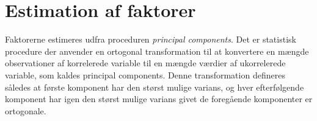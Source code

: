 \section{Estimation af faktorer}
Faktorerne estimeres udfra proceduren \textit{principal components}.
Det er statistisk procedure der anvender en ortogonal transformation til at konvertere en mængde observationer af korrelerede variable til en mængde værdier af ukorrelerede variable, som kaldes principal components.
Denne transformation defineres således at første komponent har den størst mulige varians, og hver efterfølgende komponent har igen den størst mulige varians givet de foregående komponenter er ortogonale.

